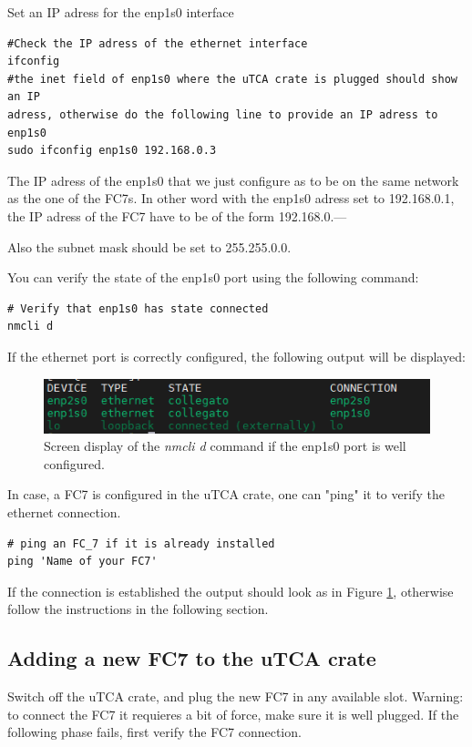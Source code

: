 \documentclass[10pt,a4paper]{article}
\begin{document}
Set an IP adress for the enp1s0 interface
\begin{framed}
\begin{verbatim}
#Check the IP adress of the ethernet interface
ifconfig 
#the inet field of enp1s0 where the uTCA crate is plugged should show an IP 
adress, otherwise do the following line to provide an IP adress to enp1s0
sudo ifconfig enp1s0 192.168.0.3  
\end{verbatim}
\end{framed}


The IP adress of the enp1s0 that we just configure as to be on the same network as the one of the FC7s. In other word with the enp1s0 adress set to 192.168.0.1, the IP adress of the FC7 have to be of the form 192.168.0.---

Also the subnet mask should be set to 255.255.0.0.

You can verify the state of the enp1s0 port using the following command:
\begin{framed}
\begin{verbatim}
# Verify that enp1s0 has state connected
nmcli d  
\end{verbatim}
\end{framed}
If the ethernet port is correctly configured, the following output will be displayed:
\begin{figure}[h!]
\centering
 \includegraphics[width=0.6\linewidth]{Nmcli_output.png} 
  \caption{Screen display of the \emph{nmcli d} command if the enp1s0 port is well configured.}
  \label{GoodPing}
\end{figure}

In case, a FC7 is configured in the uTCA crate, one can "ping" it to verify the ethernet connection.
\begin{framed}
\begin{verbatim}
# ping an FC_7 if it is already installed
ping 'Name of your FC7'  
\end{verbatim}
\end{framed}
If the connection is established the output should look as in Figure \ref{GoodPing}, otherwise follow the instructions in the following section.


\subsection{Adding a new FC7 to the uTCA crate}
Switch off the uTCA crate, and plug the new FC7 in any available slot. Warning: to connect the FC7 it requieres a bit of force, make sure it is well plugged. If the following phase fails, first verify the FC7 connection.
\end{document}
